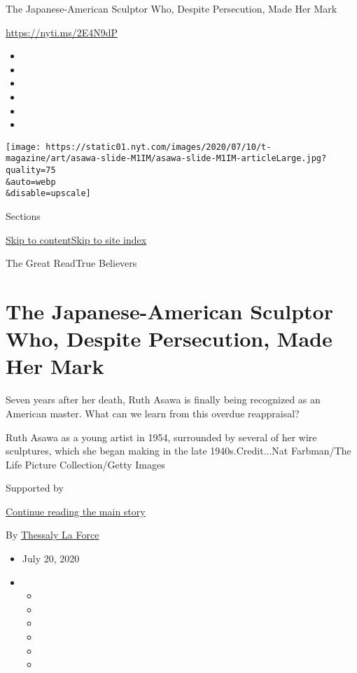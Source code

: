 The Japanese-American Sculptor Who, Despite Persecution, Made Her Mark

\url{https://nyti.ms/2E4N9dP}

\begin{itemize}
\item
\item
\item
\item
\item
\item
\end{itemize}

\texttt{[image: https://static01.nyt.com/images/2020/07/10/t-magazine/art/asawa-slide-M1IM/asawa-slide-M1IM-articleLarge.jpg?quality=75\\\&auto=webp\\\&disable=upscale]}

Sections

\protect\hyperlink{site-content}{Skip to
content}\protect\hyperlink{site-index}{Skip to site index}

The Great ReadTrue Believers

\hypertarget{the-japanese-american-sculptor-who-despite-persecution-made-her-mark}{%
\section{The Japanese-American Sculptor Who, Despite Persecution, Made
Her
Mark}\label{the-japanese-american-sculptor-who-despite-persecution-made-her-mark}}

Seven years after her death, Ruth Asawa is finally being recognized as
an American master. What can we learn from this overdue reappraisal?

Ruth Asawa as a young artist in 1954, surrounded by several of her wire
sculptures, which she began making in the late 1940s.Credit...Nat
Farbman/The Life Picture Collection/Getty Images

Supported by

\protect\hyperlink{after-sponsor}{Continue reading the main story}

By \href{https://www.nytimes.com/by/thessaly-la-force}{Thessaly La
Force}

\begin{itemize}
\item
  July 20, 2020
\item
  \begin{itemize}
  \item
  \item
  \item
  \item
  \item
  \item
  \end{itemize}
\end{itemize}

